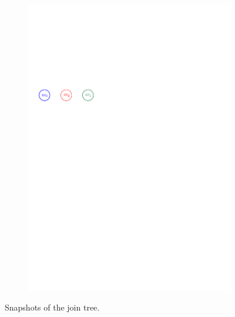 \documentclass[11pt]{article}
\theoremstyle{definition}
\begin{document}
\begin{figure}[h]
\begin{subfigure}{.33\textwidth}
     \caption{}
     \label{fig:tree2}
   \end{subfigure}
   \begin{subfigure}{.33\textwidth}
     \centering
     \includegraphics[width=.7\linewidth,page=3]{figs/mesh2}
     \caption{}
     \label{fig:tree3}
   \end{subfigure}
 \caption{Snapshots of the join tree.}
 \label{fig:mesh2}
\end{figure}
%
\end{document}
